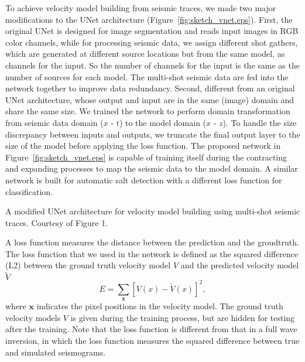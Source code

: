 \documentclass{segabs}
\begin{document}
To achieve velocity model building from seismic traces, we made two major modifications to the UNet architecture (Figure~\ref{fig:sketch_vnet.eps}).
First, the original UNet is designed for image segmentation and reads input images in RGB color channels, while for processing seismic data, we assign different shot gathers, which are generated at different source locations but from the same model, as channels for the input. So the number of channels for the input is the same as the number of sources for each model. The multi-shot seismic data are fed into the network together to improve data redundancy. Second, different from an original UNet architecture, whose output and input are in the same (image) domain and share the same size. We trained the network to perform domain transformation from seismic data domain ($x$ - $t$) to the model domain ($x$ - $z$). To handle the size discrepancy between inputs and outputs, we truncate the final output layer to the size of the model before applying the loss function. The proposed network in Figure~\ref{fig:sketch_vnet.eps} is capable of training itself during the contracting and expanding processes to map the seismic data to the model domain.
A similar network is built for automatic salt detection \citep{wenlong18_salt} with a different loss function for classification. 

{A modified UNet architecture for velocity model building using multi-shot seismic traces. Courtesy of \citet{ronneberger15} Figure 1.}

A loss function measures the distance between the prediction and the groudtruth. The loss function that we used in the network is defined as the squared difference (L2) between the ground truth velocity model $V$ and the predicted velocity model $\tilde{V}$
\begin{equation}
E = \sum_{\boldsymbol{x}} [V(x)-\tilde{V}(x)]^2,
\label{loss}
\end{equation}
where $\boldsymbol{x}$ indicates the pixel positions in the velocity model. The ground truth velocity models $V$ is given during the training process, but are hidden for testing after the training. Note that the loss function is different from that in a full wave inversion, in which the loss function measures the squared difference between true and simulated seismograms.
\end{document}
